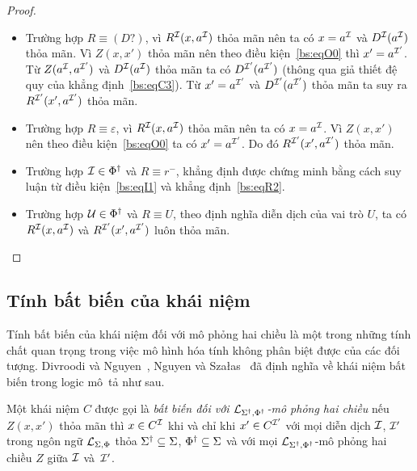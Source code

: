 \begin{proof}
\begin{itemize}
		\item Trường hợp $R \equiv (D?)$, vì $R^{\mathcal{I}}(x,a^{\mathcal{I}})$ thỏa mãn nên ta có $x=a^{\mathcal{I}}$ và $D^{\mathcal{I}}(a^{\mathcal{I}})$ thỏa mãn. Vì $Z(x,x')$ thỏa mãn nên theo điều kiện~\eqref{bs:eqO0} thì $x' = a^{\mathcal{I}'}$. Từ $Z(a^{\mathcal{I}}, a^{\mathcal{I}'})$ và $D^{\mathcal{I}}(a^{\mathcal{I}})$ thỏa mãn ta có $D^{\mathcal{I}'}(a^{\mathcal{I}'})$
		(thông qua giả thiết đệ quy của khẳng định~\eqref{bs:eqC3}). Từ $x'=a^{\mathcal{I}'}$ và $D^{\mathcal{I}'}(a^{\mathcal{I}'})$ thỏa mãn ta suy ra $R^{\mathcal{I}'}(x',a^{\mathcal{I}'})$ thỏa mãn.
		
		\item Trường hợp $R \equiv \varepsilon$, vì $R^{\mathcal{I}}(x,a^{\mathcal{I}})$ thỏa mãn nên ta có $x=a^{\mathcal{I}}$. Vì $Z(x,x')$ nên theo điều kiện~\eqref{bs:eqO0} ta có $x'=a^{\mathcal{I}'}$. Do đó $R^{\mathcal{I}'}(x',a^{\mathcal{I}'})$ thỏa mãn.
		
		\item Trường hợp $\mathcal{I} \in \Phi^\dag$ và $R \equiv r^-$, khẳng định được chứng minh bằng cách suy luận từ điều kiện~\eqref{bs:eqI1} và khẳng định~\eqref{bs:eqR2}.
		
		\item Trường hợp $\mathcal{U} \in \Phi^\dag$ và $R \equiv U$, theo định nghĩa diễn dịch của vai trò $U$, ta  có $R^{\mathcal{I}}(x,a^{\mathcal{I}})$ và $R^{\mathcal{I}'}(x',a^{\mathcal{I}'})$ luôn thỏa mãn.
	\end{itemize}
	\vspace{-7.5ex}
\end{proof}

\subsection{Tính bất biến của khái niệm}
\label{sec:Chap2.ConceptInvariant}

Tính bất biến của khái niệm đối với mô phỏng hai chiều là một trong những tính chất quan trọng trong việc mô hình hóa tính không phân biệt được của các đối tượng. Divroodi và Nguyen~\cite{Divroodi2011B}, Nguyen và Sza{\l}as~\cite{Nguyen2013} đã định nghĩa về khái niệm bất biến trong logic mô~tả như sau.

\begin{Definition}
\label{def:InvariantConcept}
	Một khái niệm $C$ được gọi là {\em bất biến đối với $\mathcal{L}_{\Sigma^\dag,\Phi^\dag}$-mô phỏng hai chiều} nếu $Z(x, x')$ thỏa mãn thì $x \in C^{\mathcal{I}}$ khi và chỉ khi $x' \in C^{\mathcal{I}'}$ với mọi diễn dịch $\mathcal{I}$, $\mathcal{I}'$ trong ngôn ngữ $\mathcal{L}_{\Sigma,\Phi}$ thỏa $\Sigma^\dag \subseteq \Sigma$, $\Phi^\dag \subseteq \Sigma$ và với mọi $\mathcal{L}_{\Sigma^\dag,\Phi^\dag}$-mô phỏng hai chiều $Z$ giữa $\mathcal{I}$ và~$\mathcal{I}'$.\myend
\end{Definition}

